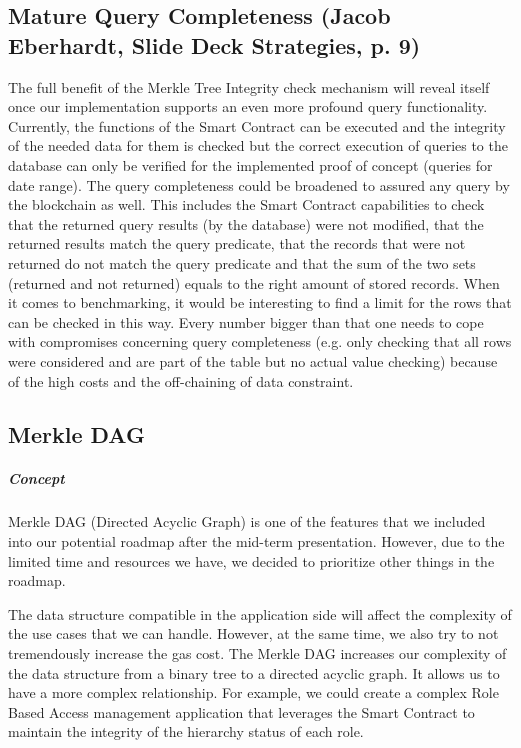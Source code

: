 \subsection{Mature Query Completeness (Jacob Eberhardt, Slide Deck Strategies, p. 9)}
The full benefit of the Merkle Tree Integrity check mechanism will reveal itself once our implementation supports an even more profound query functionality. Currently, the functions of the Smart Contract can be executed and the integrity of the needed data for them is checked but the correct execution of queries to the database can only be verified for the implemented proof of concept (queries for date range). The query completeness could be broadened to assured any query by the blockchain as well. This includes the Smart Contract capabilities to check that the returned query results (by the database) were not modified, that the returned results match the query predicate, that the records that were not returned do not match the query predicate and that the sum of the two sets (returned and not returned) equals to the right amount of stored records.
When it comes to benchmarking, it would be interesting to find a limit for the rows that can be checked in this way. Every number bigger than that one needs to cope with compromises concerning query completeness (e.g. only checking that all rows were considered and are part of the table but no actual value checking) because of the high costs and the off-chaining of data constraint.

\subsection{Merkle DAG}
\subparagraph{Concept}
Merkle DAG (Directed Acyclic Graph) is one of the features that we included into our potential roadmap after the mid-term presentation. However, due to the limited time and resources we have, we decided to prioritize other things in the roadmap.

The data structure compatible in the application side will affect the complexity of the use cases that we can handle. However, at the same time, we also try to not tremendously increase the gas cost. The Merkle DAG increases our complexity of the data structure from a binary tree to a directed acyclic graph. It allows us to have a more complex relationship. For example, we could create a complex Role Based Access management application that leverages the Smart Contract to maintain the integrity of the hierarchy status of each role.

